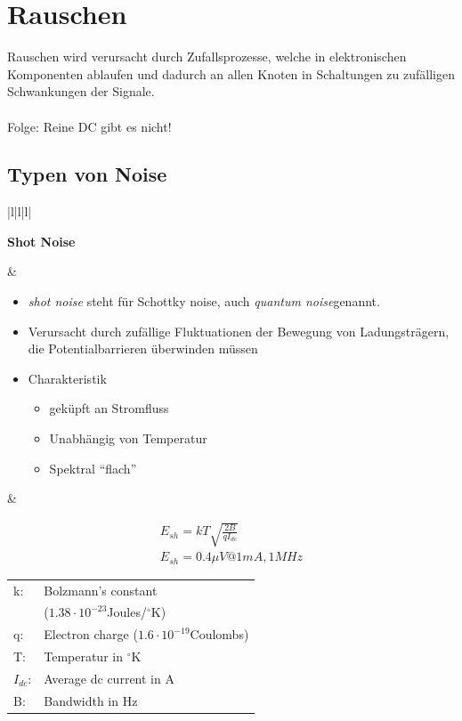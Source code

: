 \section{Rauschen}
Rauschen wird verursacht durch Zufallsprozesse, welche in elektronischen
Komponenten ablaufen und dadurch an allen Knoten in Schaltungen zu zufälligen
Schwankungen der Signale.\\
\\
Folge: Reine DC gibt es nicht!

\subsection{Typen von Noise}
\begin{longtable}{|l|l|l|}
\hline
\begin{minipage}{4cm}
\textbf{Shot Noise}
\end{minipage}
&
\begin{minipage}{6cm}
\begin{itemize}
  \item \textit{shot noise} steht für Schottky noise, auch \textit{quantum
  noise}genannt.
  \item Verursacht durch zufällige Fluktuationen der Bewegung von
  Ladungsträgern, die Potentialbarrieren überwinden müssen
  \item Charakteristik
  \begin{itemize}
    \item geküpft an Stromfluss
    \item Unabhängig von Temperatur
    \item Spektral "`flach"'
    \end{itemize}
\end{itemize}
\end{minipage}
&
\begin{minipage}{8cm}
\begin{gather}
E_{sh}=kT\sqrt{\frac{2B}{qI_{dc}}}\\
E_{sh}= 0.4\mu V @ 1mA,1MHz
\end{gather}
\begin{tabular}{ll}
	k: & Bolzmann's constant\\&($1.38 \cdot 10^{-23}$Joules/$^\circ$K)\\
	q: & Electron charge ($1.6 \cdot 10^{-19}$Coulombs)\\
	T: & Temperatur in $^\circ$K\\
	$I_{dc}$: & Average dc current in A\\
	B: & Bandwidth in Hz
\end{tabular}

\end{minipage}
\end{longtable}
